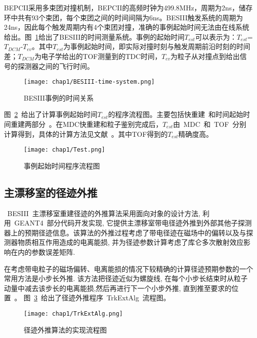 BEPCII采用多束团对撞机制，BEPCII的高频时钟为499.8MHz，周期为2ns，储存环中共有93个束团，每个束团之间的时间间隔为6ns。BESIII触发系统的周期为24ns，因此每个触发周期内有4个束团对撞，准确的事例起始时间无法由在线系统给出。图~\ref{fig:BESIII-time-system}给出了BESIII的时间测量系统。事例的起始时间$T_{est}$可以表示为：$T_{est}$=$T_{DCM}$-$T_{ev}$。其中$T_{est}$为事例起始时间，即实际对撞时刻与触发周期前沿时刻的时间差；$T_{DCM}$为电子学给出的TOF测量到的TDC时间，$T_{ev}$为粒子从对撞点到给出信号的探测器之间的飞行时间。
\begin{figure}[!h]
  \centering
  \texttt{[image: chap1/BESIII-time-system.png]}
  \caption{BESIII事例的时间关系}
  \label{fig:BESIII-time-system}
\end{figure}

图~\ref{fig:Test}~给出了计算事例起始时间$T_{est}$的程序流程图。主要包括快重建~\cite{zhangxm:2005}和时间起始时间重建两部分~\cite{max:2007}。在MDC快重建和粒子鉴别完成后，$T_{est}$由~MDC~和~TOF~分别计算得到，具体的计算方法见文献~\cite{Maxiang:2008}。其中TOF得到的$T_{est}$精确度高。

\begin{figure}[!h]
  \centering
  \texttt{[image: chap1/Test.png]}
  \caption{事例起始时间程序流程图}
  \label{fig:Test}
\end{figure}
\subsection{主漂移室的径迹外推}

~BESIII~主漂移室重建径迹的外推算法采用面向对象的设计方法, 利用~GEANT4~部分代码开发实现, 它提供主漂移室带电径迹外推到外部其他子探测器上的预期径迹信息。该算法的外推过程考虑了带电径迹在磁场中的偏转以及与探测器物质相互作用造成的电离能损, 并为径迹参数计算考虑了库仑多次散射效应影响在内的参数误差矩阵.

在考虑带电粒子的磁场偏转、电离能损的情况下较精确的计算径迹预期参数的一个常用方法是小步长外推. 该方法把径迹近似为螺旋线, 在每个小步长结束时从粒子动量中减去该步长的电离能损,然后再进行下一个小步外推, 直到推至要求的位置~\cite{wangll:2014}。
图~\ref{fig:TrkExtAlg}~给出了径迹外推程序~TrkExtAlg~流程图。

\begin{figure}[!h]
  \centering
  \texttt{[image: chap1/TrkExtAlg.png]}
  \caption{径迹外推算法的实现流程图}
  \label{fig:TrkExtAlg}
\end{figure}

